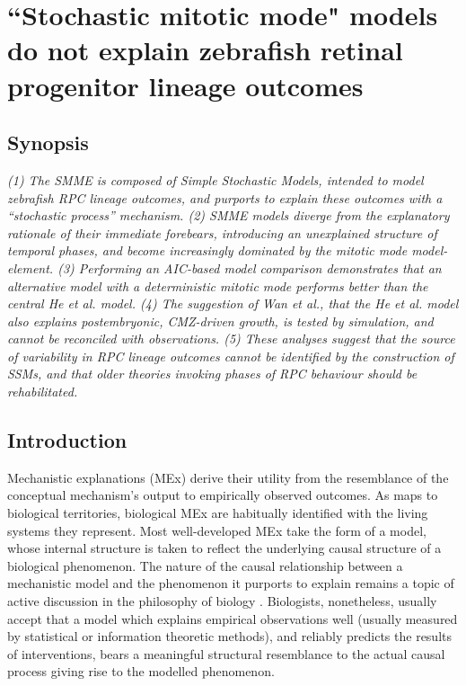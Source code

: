 \chapter{``Stochastic mitotic mode" models do not explain zebrafish retinal progenitor lineage outcomes}
\label{chap:SMME}

\section*{Synopsis}
\textit{(1) The SMME is composed of Simple Stochastic Models, intended to model zebrafish RPC lineage outcomes, and purports to explain these outcomes with a ``stochastic process'' mechanism. (2) SMME models diverge from the explanatory rationale of their immediate forebears, introducing an unexplained structure of temporal phases, and become increasingly dominated by the mitotic mode model-element. (3) Performing an AIC-based model comparison demonstrates that an alternative model with a deterministic mitotic mode performs better than the central He et al. model. (4) The suggestion of Wan et al., that the He et al. model also explains postembryonic, CMZ-driven growth, is tested by simulation, and cannot be reconciled with observations. (5) These analyses suggest that the source of variability in RPC lineage outcomes cannot be identified by the construction of SSMs, and that older theories invoking phases of RPC behaviour should be rehabilitated.}

\section{Introduction}

Mechanistic explanations (MEx) derive their utility from the resemblance of the conceptual mechanism's output to empirically observed outcomes. As maps to biological territories, biological MEx are habitually identified with the living systems they represent. Most well-developed MEx take the form of a model, whose internal structure is taken to reflect the underlying causal structure of a biological phenomenon. The nature of the causal relationship between a mechanistic model and the phenomenon it purports to explain remains a topic of active discussion in the philosophy of biology \cite{Fagan2015}. Biologists, nonetheless, usually accept that a model which explains empirical observations well (usually measured by statistical or information theoretic methods), and reliably predicts the results of interventions, bears a meaningful structural resemblance to the actual causal process giving rise to the modelled phenomenon.

